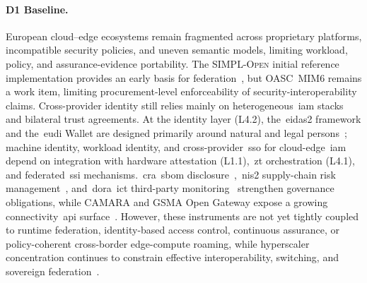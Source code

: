 \documentclass{ieeeaccess}
\begin{document}
\paragraph{D1 Baseline.}
European cloud--edge ecosystems remain fragmented across proprietary platforms, incompatible security policies, and uneven semantic models, limiting workload, policy, and assurance-evidence portability. The \textsc{SIMPL-Open} initial reference implementation provides an early basis for federation~\cite{ecsimpl}, but OASC~MIM6 remains a work item, limiting procurement-level enforceability of security-interoperability claims. Cross-provider identity still relies mainly on heterogeneous~\gls{iam} stacks and bilateral trust agreements. At the identity layer (L4.2), the~\gls{eidas2} framework and the~\gls{eudi} Wallet are designed primarily around natural and legal persons~\cite{eueidas2,eudiwallet2026,eudiwallet2024}; machine identity, workload identity, and cross-provider~\gls{sso} for cloud-edge~\gls{iam} depend on integration with hardware attestation (L1.1),~\gls{zt} orchestration (L4.1), and federated~\gls{ssi} mechanisms.~\gls{cra}~\gls{sbom} disclosure~\cite{eucra2024},~\gls{nis2} supply-chain risk management~\cite{eunis2}, and~\gls{dora}~\gls{ict} third-party monitoring~\cite{eudora,esa2025ctpp} strengthen governance obligations, while CAMARA and GSMA Open Gateway expose a growing connectivity~\gls{api} surface~\cite{camara2025,gsmaopengateway2026}. However, these instruments are not yet tightly coupled to runtime federation, identity-based access control, continuous assurance, or policy-coherent cross-border edge-compute roaming, while hyperscaler concentration continues to constrain effective interoperability, switching, and sovereign federation~\cite{synergy2025}.
\end{document}
